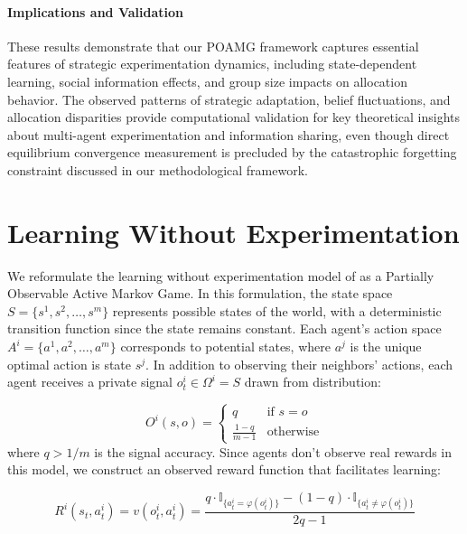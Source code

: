 \paragraph{Implications and Validation} These results demonstrate that our POAMG framework captures essential features of strategic experimentation dynamics, including state-dependent learning, social information effects, and group size impacts on allocation behavior. The observed patterns of strategic adaptation, belief fluctuations, and allocation disparities provide computational validation for key theoretical insights about multi-agent experimentation and information sharing, even though direct equilibrium convergence measurement is precluded by the catastrophic forgetting constraint discussed in our methodological framework.

\section{Learning Without Experimentation}

We reformulate the learning without experimentation model of \citet{brandl2024} as a Partially Observable Active Markov Game. In this formulation, the state space $S = \{s^1, s^2, \ldots, s^m\}$ represents possible states of the world, with a deterministic transition function since the state remains constant. Each agent's action space $A^i = \{a^1, a^2, \ldots, a^m\}$ corresponds to potential states, where $a^j$ is the unique optimal action is state $s^j$. In addition to observing their neighbors' actions, each agent receives a private signal $o^i_t \in \Omega^i = S$ drawn from distribution:

\begin{equation*}
    O^i(s,o) =
    \begin{cases}
        q               & \text{if } s = o \\
        \frac{1-q}{m-1} & \text{otherwise}
    \end{cases}
\end{equation*}
where $q > 1/m$ is the signal accuracy. Since agents don't observe real rewards in this model, we construct an observed reward function that facilitates learning:

\begin{equation*}
    R^i(s_t, a^i_t) = v(o^i_t, a^i_t) = \frac{q \cdot \mathbb{I}_{\{a^i_t = \varphi(o^i_t)\}} - (1 - q) \cdot \mathbb{I}_{\{a^i_t \neq \varphi(o^i_t)\}}}{2q - 1}
\end{equation*}

